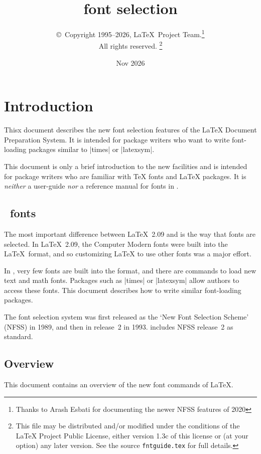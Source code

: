 \documentclass{ltxguide}[1995/11/28]
\title{\LaTeXe{} font selection}
\author{\copyright~Copyright 1995--2026, \LaTeX\ Project
  Team.\thanks{Thanks to Arash Esbati for documenting the
    newer NFSS features of 2020}\\
  All rights reserved.%
  \footnote{This file may be distributed and/or modified under the
    conditions of the \LaTeX{} Project Public License, either version 1.3c
    of this license or (at your option) any later version. See the source
   \texttt{fntguide.tex} for full details.}%
}
\date{Nov 2026}
\begin{document}
\maketitle

\tableofcontents

\section{Introduction}

Thisx document describes the new font selection features of the \LaTeX{}
Document Preparation System.  It is intended for package writers who
want to write font-loading packages similar to |times| or |latexsym|.

This document is only a brief introduction to the new facilities and is
intended for package writers who are familiar with \TeX{} fonts and
\LaTeX{} packages.  It is \emph{neither} a user-guide \emph{nor} a
reference manual for fonts in \LaTeXe.

\subsection{\LaTeXe~fonts}

The most important difference between \LaTeX~2.09 and \LaTeXe{} is the
way that fonts are selected.  In \LaTeX~2.09, the Computer Modern fonts
were built into the \LaTeX~format, and so customizing \LaTeX{} to use
other fonts was a major effort.

In \LaTeXe, very few fonts are built into the format, and there are
commands to load new text and math fonts.  Packages such as |times| or
|latexsym| allow authors to access these fonts.  This document describes
how to write similar font-loading packages.

The \LaTeXe{} font selection system was first released as the `New Font
Selection Scheme' (NFSS) in 1989, and then in release~2 in 1993.
\LaTeXe{} includes NFSS release~2 as standard.

\subsection{Overview}

This document contains an overview of the new font commands of \LaTeX.
\end{document}
